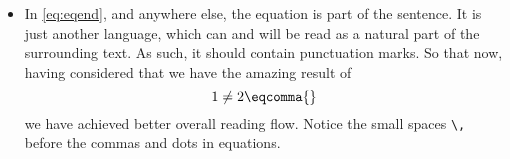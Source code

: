 \begin{itemize}
	We can \verb|\DeclareMathOperator{\examplemean}{MEAN}|, then use \verb|\text| for the subscript:
	\begin{equation}\label{eq:eqend}
		\examplemean_{\text{sample}} \neq 2 \eqend{}
	\end{equation}
	\item In \cref{eq:eqend}, and anywhere else, the equation is part of the sentence.
	It is just another language, which can and will be read as a natural part of the surrounding text.
	As such, it should contain punctuation marks.
	So that now, having considered that we have the amazing result of
	\begin{equation}
		1 \neq 2 \eqcomma{}
	\end{equation}
	we have achieved better overall reading flow.
	Notice the small spaces \verb|\,| before the commas and dots in equations.
\end{itemize}